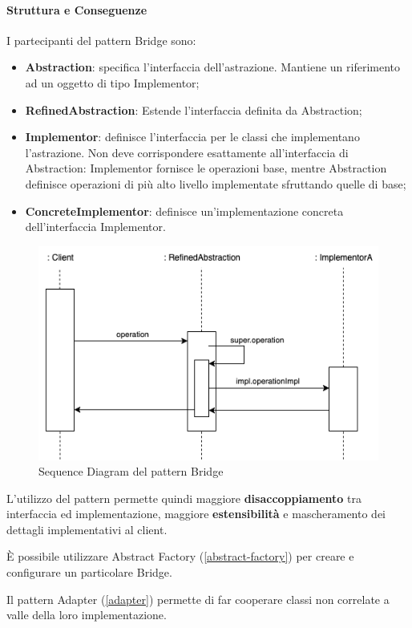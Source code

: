 \paragraph{Struttura e Conseguenze} I partecipanti del pattern Bridge sono:
\begin{itemize}
    \item \textbf{Abstraction}: specifica l’interfaccia dell’astrazione. Mantiene un riferimento ad un oggetto di tipo Implementor;
    \item \textbf{RefinedAbstraction}: Estende l’interfaccia definita da Abstraction;
    \item \textbf{Implementor}: definisce l’interfaccia per le classi che implementano l’astrazione. Non deve corrispondere esattamente all’interfaccia di Abstraction: Implementor fornisce le operazioni base, mentre Abstraction definisce operazioni di più alto livello implementate sfruttando quelle di base;
    \item \textbf{ConcreteImplementor}: definisce un’implementazione concreta dell’interfaccia Implementor.
\end{itemize}

\begin{figure}[H]
    \centering
    \includegraphics[width=1\linewidth]{assets/pattern/bridge/bridge-sequence.drawio.png}
    \caption{Sequence Diagram del pattern Bridge}
\end{figure}

L'utilizzo del pattern permette quindi maggiore \textbf{disaccoppiamento} tra interfaccia ed implementazione, maggiore \textbf{estensibilità} e mascheramento dei dettagli implementativi al client.

È possibile utilizzare Abstract Factory (\ref{abstract-factory}) per creare e configurare un particolare Bridge.

Il pattern Adapter (\ref{adapter}) permette di far cooperare classi non correlate a valle della loro implementazione.



\newpage